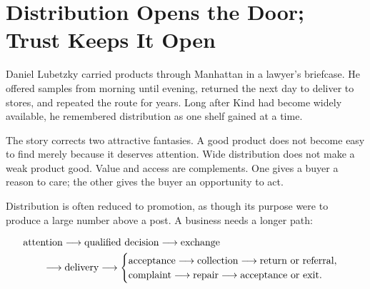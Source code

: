 \chapter{Distribution Opens the Door; Trust Keeps It Open}

Daniel Lubetzky carried products through Manhattan in a lawyer's briefcase. He
offered samples from morning until evening, returned the next day to deliver to
stores, and repeated the route for years. Long after Kind had become widely
available, he remembered distribution as one shelf gained at a time.

The story corrects two attractive fantasies. A good product does not become
easy to find merely because it deserves attention. Wide distribution does not
make a weak product good. Value and access are complements. One gives a buyer a
reason to care; the other gives the buyer an opportunity to act.

Distribution is often reduced to promotion, as though its purpose were to
produce a large number above a post. A business needs a longer path:

\begin{equation}
\ifdim\paperwidth<450pt
\begin{aligned}
\text{attention}&\longrightarrow\text{qualified decision}
  \longrightarrow\text{exchange}\\
&\longrightarrow\text{delivery},\\
\text{delivery}&\longrightarrow\text{acceptance}
  \longrightarrow\text{collection}\\
&\longrightarrow\text{return or referral},\\
\text{delivery}&\longrightarrow\text{complaint}
  \longrightarrow\text{repair}\\
&\longrightarrow\text{acceptance or exit}.
\end{aligned}
\else
\begin{aligned}
&\text{attention}\longrightarrow\text{qualified decision}
  \longrightarrow\text{exchange}\\
&\qquad\longrightarrow\text{delivery}\longrightarrow
\begin{cases}
\text{acceptance}\longrightarrow\text{collection}
  \longrightarrow\text{return or referral},\\
\text{complaint}\longrightarrow\text{repair}
  \longrightarrow\text{acceptance or exit}.
\end{cases}
\end{aligned}
\fi
\end{equation}

